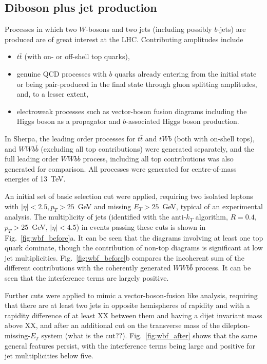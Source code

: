 \documentclass[11pt]{cernrep}
\begin{document}
\subsection{Diboson plus jet production}

Processes in which two $W$-bosons and two jets (including possibly $b$-jets) are produced are of great interest
at the LHC.  Contributing amplitudes include
\begin{itemize}
\item $t\bar{t}$ (with on- or off-shell top quarks),
\item genuine QCD processes with $b$ quarks already entering from the initial state or being
  pair-produced in the final state through gluon splitting amplitudes, and, to a lesser extent,
\item electroweak processes such as vector-boson fusion diagrams including the Higgs boson
  as a propagator and $b$-associated Higgs boson production.
\end{itemize}
In Sherpa, the leading order processes for $t\bar{t}$ and $tWb$ (both with on-shell tops), and $WWb\bar{b}$
(excluding all top contributions) were generated separately, and the full leading order $WWb\bar{b}$ process,
including all top contributions was also generated for comparison. All processes were generated for centre-of-mass
energies of 13~TeV. 

An initial set of basic selection cut were applied, requiring two isolated leptons with $|\eta| < 2.5, p_T > 25$~GeV and
missing $E_T > 25$~GeV, typical of an experimental analysis. The multiplicity of jets (identified with the anti-$k_T$
algorithm, $R=0.4$, $p_T > 25$~GeV, $|\eta| < 4.5$) in events passing these cuts is shown in Fig.~\ref{fig:wbf_before}a.
It can be seen that the diagrams involving at least one top quark dominate, though the contribution of non-top diagrams
is significant at low jet multiplicities.  Fig.~\ref{fig:wbf_before}b compares the incoherent sum of the different
contributions with the coherently generated $WWb\bar{b}$ process. It can be seen that the interference terms are largely
positive.

Further cuts were applied to mimic a vector-boson-fusion like analysis, requiring that there are at least two jets in
opposite hemispheres of rapidity and with a rapidity difference of at least XX between them and having a dijet invariant
mass above XX, and after an additional cut on the transverse mass of the dilepton-missing-$E_T$ system (what is the cut??).
Fig.~\ref{fig:wbf_after} shows that the same general features persist, with the interference terms being large and
positive for jet mulitiplicities below five.
\end{document}
